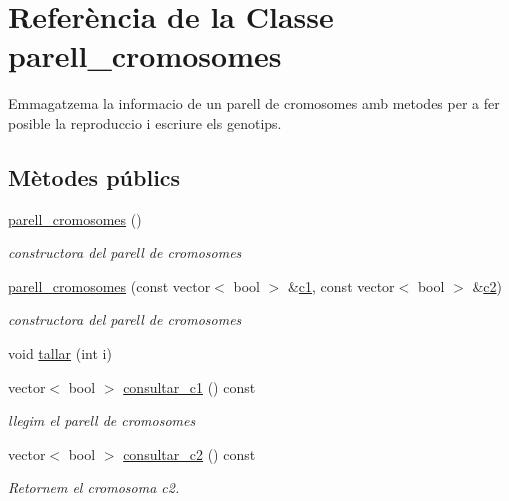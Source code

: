 \hypertarget{classparell__cromosomes}{}\section{Referència de la Classe parell\+\_\+cromosomes}
\label{classparell__cromosomes}


Emmagatzema la informacio de un parell de cromosomes amb metodes per a fer posible la reproduccio i escriure els genotips.  


\subsection*{Mètodes públics}
\begin{DoxyCompactItemize}
\item 
\hyperlink{classparell__cromosomes_a9d86452d029f65ccf80c8861c4914698}{parell\+\_\+cromosomes} ()
\begin{DoxyCompactList}\small\item\em constructora del parell de cromosomes \end{DoxyCompactList}\item 
\hyperlink{classparell__cromosomes_aa7f0798619677ef4715f2d94ecd39769}{parell\+\_\+cromosomes} (const vector$<$ bool $>$ \&\hyperlink{classparell__cromosomes_ab4d7cfc40f53a1698b4ea3ef1f2cd199}{c1}, const vector$<$ bool $>$ \&\hyperlink{classparell__cromosomes_a888f09ecbc3329b0ee505fb0cb8bf98f}{c2})
\begin{DoxyCompactList}\small\item\em constructora del parell de cromosomes \end{DoxyCompactList}\item 
void \hyperlink{classparell__cromosomes_a3192f21452f2885d61032eb547cb4a15}{tallar} (int i)
\item 
vector$<$ bool $>$ \hyperlink{classparell__cromosomes_a25cf02baa8f399adc798289773729b5e}{consultar\+\_\+c1} () const 
\begin{DoxyCompactList}\small\item\em llegim el parell de cromosomes \end{DoxyCompactList}\item 
vector$<$ bool $>$ \hyperlink{classparell__cromosomes_a4c29928abe72237272e5e1e219dc3e9d}{consultar\+\_\+c2} () const 
\begin{DoxyCompactList}\small\item\em Retornem el cromosoma c2. \end{DoxyCompactList}\item 

\end{DoxyCompactItemize}
